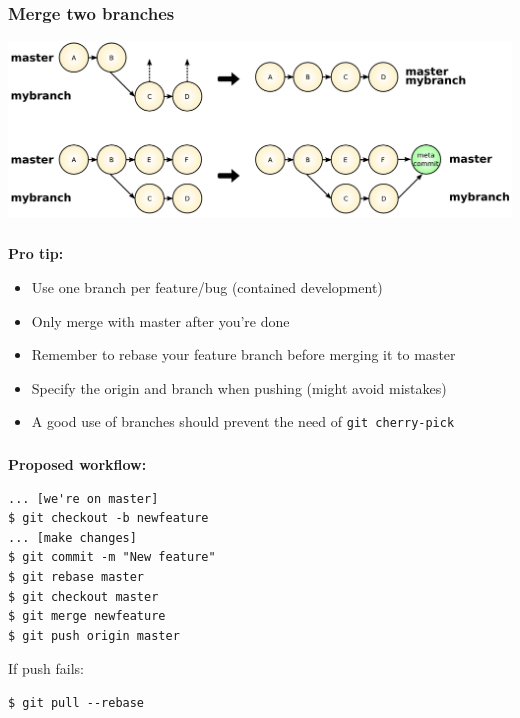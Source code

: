 
\begin{frame}
  \frametitle{Merge two branches}

  \begin{center}
    \includegraphics[width=1.0\textwidth]{images/git-merge.png}
  \end{center}

\end{frame}


\begin{frame}
  \frametitle{\insertsubsection}

  \textbf{Pro tip:}\\
  \begin{itemize}
    \item Use one branch per feature/bug (contained development)
    \item Only merge with master after you're done
    \item Remember to rebase your feature branch before merging it to master
    \item Specify the origin and branch when pushing (might avoid mistakes)
    \item A good use of branches should prevent the need of \texttt{git cherry-pick}
  \end{itemize}

\end{frame}


\begin{frame}[fragile]
  \frametitle{\insertsubsection}

\textbf{Proposed workflow:}\\

\begin{verbatim}
... [we're on master]
$ git checkout -b newfeature
... [make changes]
$ git commit -m "New feature"
$ git rebase master
$ git checkout master
$ git merge newfeature
$ git push origin master
\end{verbatim}

If push fails:\\
\begin{verbatim}
$ git pull --rebase
\end{verbatim}

\end{frame}

